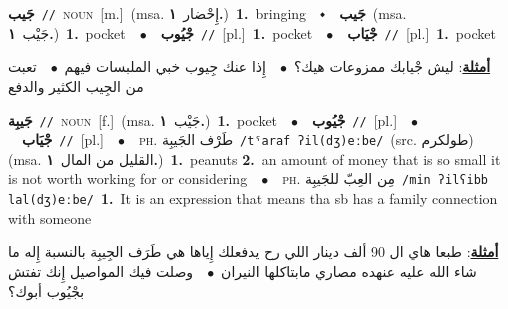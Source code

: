 \documentclass[10pt,a4paper,twoside]{article} %
\begin{document}
\begin{multicols}{2}
{\setlength\topsep{0pt}\textbf{\foreignlanguage{arabic}{جَيب}}\ {\color{gray}\texttt{//}\color{black}}\ \textsc{noun}\ [m.]\ \color{gray}(msa. \foreignlanguage{arabic}{إِحْضار}~\foreignlanguage{arabic}{\textbf{١.}})\color{black}\ \textbf{1.}~bringing\ \ $\smblkdiamond$\ \ \setlength\topsep{0pt}\textbf{\foreignlanguage{arabic}{جَيب}}\ \color{gray}(msa. \foreignlanguage{arabic}{جَيْب}~\foreignlanguage{arabic}{\textbf{١.}})\color{black}\ \textbf{1.}~pocket\ \ $\bullet$\ \ \setlength\topsep{0pt}\textbf{\foreignlanguage{arabic}{جْيُوب}}\ {\color{gray}\texttt{//}\color{black}}\ [pl.]\ \textbf{1.}~pocket\ \ $\bullet$\ \ \setlength\topsep{0pt}\textbf{\foreignlanguage{arabic}{جْيَاب}}\ {\color{gray}\texttt{//}\color{black}}\ [pl.]\ \textbf{1.}~pocket\  \begin{flushright}\color{gray}\foreignlanguage{arabic}{\textbf{\underline{\foreignlanguage{arabic}{أمثلة}}}: ليش  جْيابك ممزوعات هيك؟\ $\bullet$\ \  إِذا عنك جِيوب خبي الملبسات فيهم\ $\bullet$\ \  تعبت من الجِيب الكثير والدفع}\end{flushright}\color{black}} \vspace{2mm}

{\setlength\topsep{0pt}\textbf{\foreignlanguage{arabic}{جَيبِة}}\ {\color{gray}\texttt{//}\color{black}}\ \textsc{noun}\ [f.]\ \color{gray}(msa. \foreignlanguage{arabic}{جَيْب}~\foreignlanguage{arabic}{\textbf{١.}})\color{black}\ \textbf{1.}~pocket\ \ $\bullet$\ \ \setlength\topsep{0pt}\textbf{\foreignlanguage{arabic}{جْيُوب}}\ {\color{gray}\texttt{//}\color{black}}\ [pl.]\ \ $\bullet$\ \ \setlength\topsep{0pt}\textbf{\foreignlanguage{arabic}{جْيَاب}}\ {\color{gray}\texttt{//}\color{black}}\ [pl.]\ \ $\bullet$\ \ \textsc{ph.} \color{gray} \foreignlanguage{arabic}{طَرْف الجَيبِة}\color{black}\ {\color{gray}\texttt{/{\sffamily tˤaraf ʔil(dʒ)eːbe}/}\color{black}}\ \color{gray}(src. \foreignlanguage{arabic}{طولكرم})\color{black}\ \color{gray} (msa. \foreignlanguage{arabic}{القليل من المال}~\foreignlanguage{arabic}{\textbf{١.}})\color{black}\ \textbf{1.}~peanuts  \textbf{2.}~an amount of money that is so small it is not worth working for or considering\ \ $\bullet$\ \ \textsc{ph.} \color{gray} \foreignlanguage{arabic}{مِن العِبّ للجَيبِة}\color{black}\ {\color{gray}\texttt{/{\sffamily min ʔilʕibb lal(dʒ)eːbe}/}\color{black}}\ \textbf{1.}~It is an expression that means tha sb has a family connection with someone\  \begin{flushright}\color{gray}\foreignlanguage{arabic}{\textbf{\underline{\foreignlanguage{arabic}{أمثلة}}}: طبعا هاي ال 90 ألف دينار اللي رح يدفعلك إِياها هي طَرَف الجِيبِة بالنسبة إِله ما شاء الله عليه عنهده مصاري مابتاكلها النيران\ $\bullet$\ \  وصلت فيك المواصيل إِنك تفتش بجْيُوب أبوك؟}\end{flushright}\color{black}} \vspace{2mm}


\end{multicols}
\end{document}
